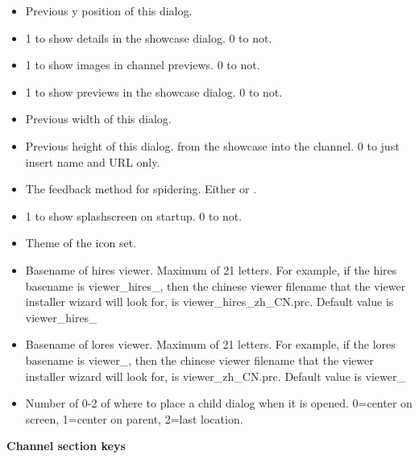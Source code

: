 \begin{helponly}
\begin{itemize}
  \item {} Previous y position of this dialog.
  \item {} 1 to show details in the showcase
    dialog. 0 to not.
  \item {} 1 to show images in channel
    previews. 0 to not.
  \item {} 1 to show previews in the showcase
    dialog. 0 to not.    
  \item {} Previous width of this dialog.
  \item {} Previous height of this dialog.
    from the showcase into the channel. 0 to just insert name and URL only.
  \item {} The feedback method for spidering. 
    Either  or .
  \item {} 1 to show splashscreen on startup. 0 to not.
  \item {} Theme of the icon set.
    \item {} Basename of hires viewer. Maximum of
    21 letters. For example, if the hires basename is viewer_hires_, then the 
	chinese viewer filename that the viewer installer wizard will look for, is
	viewer_hires_zh_CN.prc. Default value is viewer_hires_
  \item {} Basename of lores viewer. Maximum of
    21 letters. For example, if the lores basename is viewer_, then the 
	chinese viewer filename that the viewer installer wizard will look for, is
	viewer_zh_CN.prc. Default value is viewer_
  \item {} Number of 0-2 of where to place a child
    dialog when it is opened. 0=center on screen, 1=center on parent,
    2=last location.
\end{itemize}

\bf{Channel section keys}


\end{helponly}
